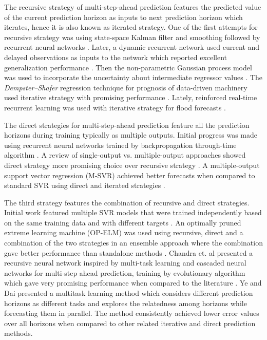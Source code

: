 \documentclass[final,5p,times,twocolumn]{elsarticle}
\begin{document}
  
The recursive strategy of multi-step-ahead prediction features the predicted value of the current prediction horizon as inputs to next prediction horizon which iterates, hence it is also known as iterated
strategy. One of the first attempts for  recursive strategy was using state-space Kalman filter and smoothing      \cite{ng1990recursive} followed by  recurrent neural 
networks  \cite{Su1992}.  Later,   a dynamic recurrent network used current and delayed  observations  as inputs
to the network which reported   
excellent generalization performance  
\cite{Parlos2000}. Then the
non-parametric Gaussian process model was used to   incorporate the uncertainty about intermediate regressor 
values \cite{BeckerNIPS2002}.  The \textit{Dempster–Shafer} regression technique  for  prognosis of data-driven machinery used iterative strategy      with promising 
performance \cite{Niu2009}.   Lately, reinforced real-time recurrent learning  was used with iterative strategy for  flood forecasts  
\cite{chang2012reinforced}.    



The direct strategies for multi-step-ahead prediction feature all the  prediction horizons during training typically as multiple outputs.
Initial progress was made using recurrent neural networks trained by backpropagation through-time 
algorithm \cite{bone2002multi}. A  review of single-output vs. multiple-output 
approaches  showed  direct strategy 
more  promising choice over recursive strategy  \cite{BenTaieb2010}.    A  multiple-output support vector regression (M-SVR)   achieved  
better  forecasts  when compared to   standard SVR using direct 
and iterated strategies \cite{Bao2014}. 
  
The third  strategy features the  combination of recursive and direct strategies. Initial work featured  multiple SVR   models  that were trained 
independently 
based on the same training data and with different
targets \cite{zhang2013iterated}. An optimally pruned 
extreme learning machine (OP-ELM) was  used    using 
recursive, direct and a combination of the two strategies in an ensemble 
approach where the combination   gave better 
performance than  standalone methods \cite{Grigorievskiy2014}. Chandra et. al \cite{chandra2017CMTLMulti} presented a recursive neural network inspired by multi-task learning and cascaded neural networks for multi-step ahead prediction, training by evolutionary algorithm which gave very promising performance when compared to the literature . 
Ye and Dai \cite{YE2019227} presented a multitask learning method  which considers different prediction  horizons as different tasks and explores the relatedness among horizons while forecasting them in parallel. The method consistently achieved lower error values over all horizons when compared to other related  iterative and direct prediction methods. 
 
\end{document}
